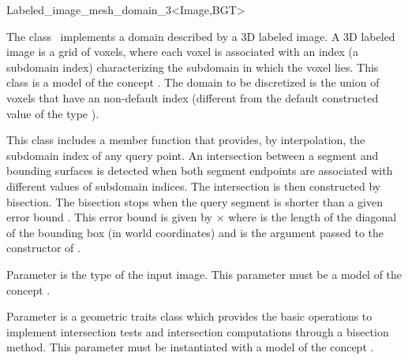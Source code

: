\ccRefPageBegin


\begin{ccRefClass}{Labeled_image_mesh_domain_3<Image,BGT>}  %


\ccDefinition
  
The class \ccRefName\ implements a domain described by a 3D labeled image.  A 3D
labeled image is a grid of voxels, where each voxel is associated with an index
(a subdomain index) characterizing the subdomain in which the voxel lies.  This
class is a model of the concept . The domain to be discretized
is the union of voxels that have an non-default index (different from the
default constructed value of the type ).

This class includes a member function that provides,  by interpolation,  the subdomain index of any
query point.  An intersection between a segment and bounding
surfaces is detected when both segment endpoints are associated with different
values of subdomain indices.  The intersection is then constructed by bisection.
The bisection stops when the query segment is shorter than a given error bound
. This error bound is given by $\times$ where  is the
length of the diagonal of the bounding box (in world coordinates) and
 is the argument passed to the constructor of \ccRefName{}.

\ccParameters

Parameter  is the type of the input image.
This parameter must be a model of the concept
.

Parameter  is a geometric traits class which provides
the basic operations to implement
intersection tests and  intersection computations
through a bisection method. This parameter must be instantiated
with a model of the concept .


\end{ccRefClass}
